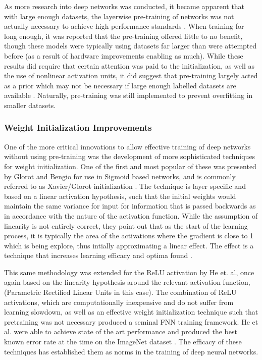\documentclass[a4paper,11pt,oneside]{article}
\theoremstyle{plain}
\theoremstyle{definition}
\begin{document}
As more research into deep networks was conducted, it became apparent that with large enough datasets, the
 layerwise pre-training of networks was not actually necessary to achieve high performance standards 
 \cite{ImageNet, Glorot2, Ciresan}. When training for long enough, it was reported that the pre-training offered little to no 
 benefit, though these models were typically using datasets far larger than were attempted before (as a result of
  hardware improvements enabling as much). While these results did require that certain attention was paid to the 
  initialization, as well as the use of nonlinear activation units, it did suggest that pre-training largely acted as a prior 
  which may not be necessary if large enough labelled datasets are available \cite{Bengio3}. Naturally, pre-training was still 
  implemented to prevent overfitting in smaller datasets.
\hfill \break 

\subsubsection{Weight Initialization Improvements}\label{lr_weight_init}

One of the more critical innovations to allow effective training of deep networks without using pre-training was the development of more sophisticated techniques for weight initialization. One of the first and most popular of these was presented by Glorot and Bengio for use in Sigmoid based networks, 
and is commonly referred to as Xavier/Glorot initialization \cite{Glorot}. The technique is layer specific and based on a linear activation
hypothesis, such that the initial weights would maintain the same variance for input for information that is passed backwards as in 
accordance with the nature of the activation function. While the assumption of linearity is not entirely correct, they point out that as the 
start of the learning process, it is typically the area of the activations where the gradient is close to 1 which is being explore, thus intially approximating 
a linear effect. The effect is a technique that increases learning efficacy and optima found \cite{Glorot}. \newline

This same methodology was extended for the ReLU activation by He et. al, once again based on the linearity hypothesis around the 
relevant activation function, (Parametric Rectified Linear Units in this case). The combination of ReLU activations, which are computationally inexpensive and do not suffer from learning slowdown, as well as an effective weight initialization technique such that pretraining was not necessary produced a seminal FNN training framework. He et al. were able to 
achieve state of the art performance and produced the best known error rate at the time on the ImageNet dataset \cite{He}. The efficacy of these techniques has established 
them as norms in the training of deep neural networks.
\end{document}
